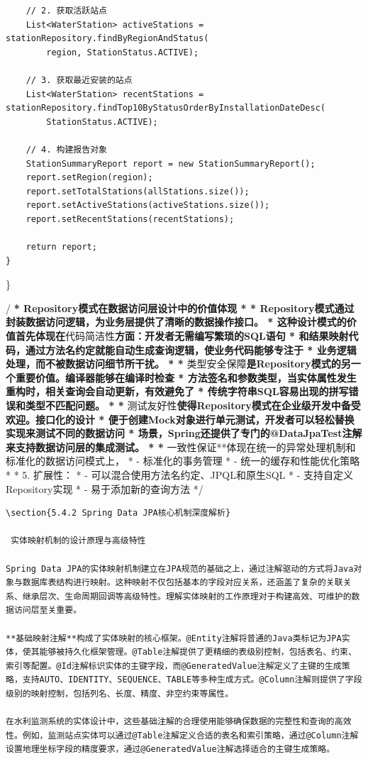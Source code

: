 \begin{verbatim}
    // 2. 获取活跃站点
    List<WaterStation> activeStations = stationRepository.findByRegionAndStatus(
        region, StationStatus.ACTIVE);
    
    // 3. 获取最近安装的站点
    List<WaterStation> recentStations = stationRepository.findTop10ByStatusOrderByInstallationDateDesc(
        StationStatus.ACTIVE);
    
    // 4. 构建报告对象
    StationSummaryReport report = new StationSummaryReport();
    report.setRegion(region);
    report.setTotalStations(allStations.size());
    report.setActiveStations(activeStations.size());
    report.setRecentStations(recentStations);
    
    return report;
}
\end{verbatim}

\}

/\textbf{ * Repository模式在数据访问层设计中的价值体现 * * Repository模式通过封装数据访问逻辑，为业务层提供了清晰的数据操作接口。 * 这种设计模式的价值首先体现在}代码简洁性\textbf{方面：开发者无需编写繁琐的SQL语句 * 和结果映射代码，通过方法名约定就能自动生成查询逻辑，使业务代码能够专注于 * 业务逻辑处理，而不被数据访问细节所干扰。 * * }类型安全保障\textbf{是Repository模式的另一个重要价值。编译器能够在编译时检查 * 方法签名和参数类型，当实体属性发生重构时，相关查询会自动更新，有效避免了 * 传统字符串SQL容易出现的拼写错误和类型不匹配问题。 * * }测试友好性\textbf{使得Repository模式在企业级开发中备受欢迎。接口化的设计 * 便于创建Mock对象进行单元测试，开发者可以轻松替换实现来测试不同的数据访问 * 场景，Spring还提供了专门的@DataJpaTest注解来支持数据访问层的集成测试。 * * }一致性保证**体现在统一的异常处理机制和标准化的数据访问模式上， * - 标准化的事务管理 * - 统一的缓存和性能优化策略 * * 5. 扩展性： * - 可以混合使用方法名约定、JPQL和原生SQL * - 支持自定义Repository实现 * - 易于添加新的查询方法 */

\begin{lstlisting}
\section{5.4.2 Spring Data JPA核心机制深度解析}

 实体映射机制的设计原理与高级特性

Spring Data JPA的实体映射机制建立在JPA规范的基础之上，通过注解驱动的方式将Java对象与数据库表结构进行映射。这种映射不仅包括基本的字段对应关系，还涵盖了复杂的关联关系、继承层次、生命周期回调等高级特性。理解实体映射的工作原理对于构建高效、可维护的数据访问层至关重要。

**基础映射注解**构成了实体映射的核心框架。@Entity注解将普通的Java类标记为JPA实体，使其能够被持久化框架管理。@Table注解提供了更精细的表级别控制，包括表名、约束、索引等配置。@Id注解标识实体的主键字段，而@GeneratedValue注解定义了主键的生成策略，支持AUTO、IDENTITY、SEQUENCE、TABLE等多种生成方式。@Column注解则提供了字段级别的映射控制，包括列名、长度、精度、非空约束等属性。

在水利监测系统的实体设计中，这些基础注解的合理使用能够确保数据的完整性和查询的高效性。例如，监测站点实体可以通过@Table注解定义合适的表名和索引策略，通过@Column注解设置地理坐标字段的精度要求，通过@GeneratedValue注解选择适合的主键生成策略。
\end{lstlisting}

